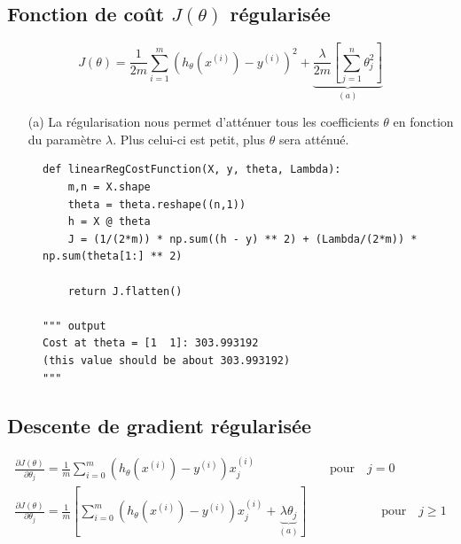 \subsection{Fonction de coût $J(\theta)$ régularisée}


\begin{equation}\label{eq:cout-reg}
    J(\theta) = \frac{1}{2m} \sum_{i=1}^{m}(h_\theta(x^{(i)}) - y^{(i)})^2 + \underbrace{\frac{\lambda}{2m} \left[\sum_{j=1}^{n} \theta_j^2\right]}_{(a)}
 \end{equation} 

\begin{itemize}
    \item [(a)] La régularisation nous permet d'atténuer tous les coefficients $\theta$ en fonction du paramètre $\lambda$. Plus celui-ci est petit, plus $\theta$ sera atténué.
\end{itemize}

\begin{figure}[!h]
\begin{verbatim}
def linearRegCostFunction(X, y, theta, Lambda):
    m,n = X.shape 
    theta = theta.reshape((n,1)) 
    h = X @ theta
    J = (1/(2*m)) * np.sum((h - y) ** 2) + (Lambda/(2*m)) * np.sum(theta[1:] ** 2)

    return J.flatten()

""" output
Cost at theta = [1  1]: 303.993192 
(this value should be about 303.993192)
"""
\end{verbatim}   
\end{figure}




\subsection{Descente de gradient régularisée}
\begin{align}\label{eq:descente-gradient-reg}
    \frac{\partial J(\theta)}{\partial \theta_j} = \frac{1}{m} \sum_{i=0}^{m} (h_\theta(x^{(i)}) - y^{(i)}) x_j^{(i)} \qquad \qquad \qquad \text{pour} \quad j=0 \\
    \frac{\partial J(\theta)}{\partial \theta_j} = \frac{1}{m} \left[ \sum_{i=0}^{m} (h_\theta(x^{(i)}) - y^{(i)}) x_j^{(i)} + \underbrace{\lambda \theta_j}_{(a)} \right] \qquad \qquad \qquad \text{pour} \quad j\geq1 \nonumber
\end{align}

